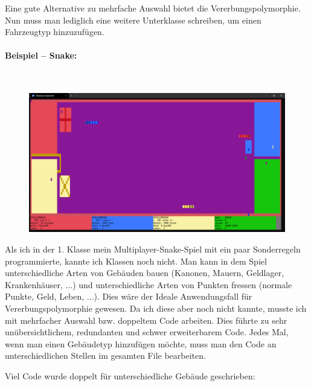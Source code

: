 				Eine gute Alternative zu mehrfache Auswahl bietet die Vererbungspolymorphie.
				\UseRawInputEncoding{}
				Nun muss man lediglich eine weitere Unterklasse schreiben, um einen Fahrzeugtyp hinzuzufügen.
			
			\paragraph*{Beispiel -- Snake:}\mbox{}\\
				\begin{figure}[H]
					\includegraphics[width=\textwidth]{polymorphie/universell/vererbung/beispiele/snake/snake.png}
				\end{figure}
				
				Als ich in der 1. Klasse mein Multiplayer-Snake-Spiel mit ein paar Sonderregeln programmierte, kannte ich
				Klassen noch nicht. Man kann in dem Spiel unterschiedliche Arten von Gebäuden bauen (Kanonen, Mauern,
				Geldlager, Krankenhäuser, ...) und unterschiedliche Arten von Punkten fressen (normale Punkte, Geld, Leben,
				...). Dies wäre der Ideale Anwendungsfall für Vererbungspolymorphie gewesen. Da ich diese aber noch nicht
				kannte, musste ich mit mehrfacher Auswahl bzw. doppeltem Code arbeiten. Dies führte zu sehr unübersichtlichem,
				redundanten und schwer erweiterbarem Code. Jedes Mal, wenn man einen Gebäudetyp hinzufügen möchte, muss man den
				Code an unterschiedlichen Stellen im gesamten File bearbeiten.
				
				Viel Code wurde doppelt für unterschiedliche Gebäude geschrieben:
				
				\UseRawInputEncoding{}
				
